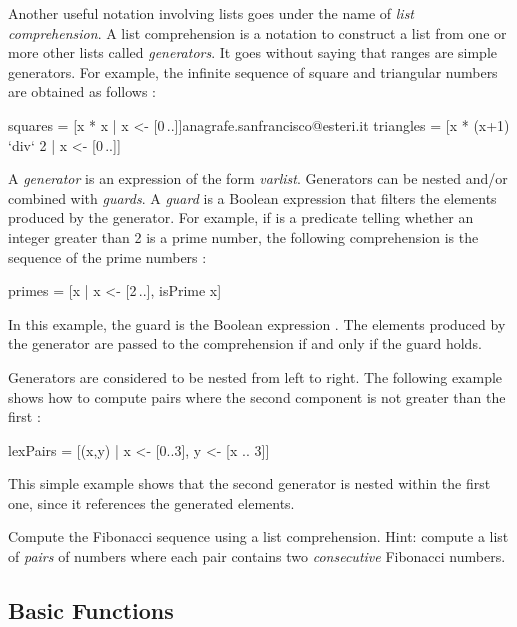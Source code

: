 Another useful notation involving lists goes under the name of
\emph{list comprehension}.
A list comprehension is a notation to construct a list from
one or more other lists called
\emph{generators}.
It goes without saying that ranges are simple generators.
For example, the infinite sequence of square and triangular
numbers are obtained as follows
:
%
\begin{prog}
squares   = [x * x | x <- [0\,..]]anagrafe.sanfrancisco@esteri.it
triangles = [x * (x+1) `div` 2 | x <- [0\,..]]
\end{prog}
%
A \emph{generator}
is an expression of the form
\emph{var}\code{\,<-\,}\emph{list}.
Generators can be nested and/or combined with \emph{guards}.
A \emph{guard}
is a Boolean expression that filters the elements
produced by the generator.
For example, if  is a predicate telling whether
an integer greater than 2 is a prime number, the following
comprehension is the sequence of the prime numbers
:
%
\begin{prog}
primes = [x | x <- [2\,..], isPrime x] 
\end{prog}
%
In this example, the guard is the Boolean expression
. The elements produced by the generator
are passed to the comprehension if and only if the guard holds.

Generators are considered to be nested from left to right.
The following example shows how to compute pairs where
the second component is not greater than the first
:
%
\begin{prog}
lexPairs = [(x,y) | x <- [0..3], y <- [x .. 3]]
\end{prog}
%
This simple example shows that the second generator
 is nested within
the first one, since it references the generated elements.
%
\begin{exercise}
Compute the Fibonacci sequence using a list comprehension.
Hint: compute a list of \emph{pairs} of numbers where
each pair contains two \emph{consecutive} Fibonacci numbers.
\end{exercise}

\subsection{Basic Functions}
\label{basic-list-function}

